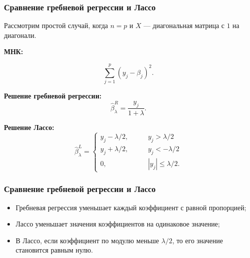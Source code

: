 \documentclass[unicode, notheorems]{beamer}
\begin{document}
\begin{frame}
\begin{frame}
\end{frame}


\begin{frame}
\frametitle{Сравнение гребневой регрессии и Лассо}
Рассмотрим простой случай, когда $n = p$ и $X$ --- диагональная матрица с $1$ на диагонали.

\textbf{МНК:}

\[\sum_{j =1}^p (y_j - \beta_j)^2.\]

\textbf{Решение гребневой регрессии:}
\[\hat{\beta}_{\lambda}^R = \frac{y_j}{1 + \lambda}.\]

\textbf{Решение Лассо:}
\begin{equation*}
\hat{\beta}_{\lambda}^L = 
 \begin{cases}
   y_j - \lambda/2, & \qquad y_j > \lambda/2\\
   y_j + \lambda/2, & \qquad y_j < -\lambda/2 \\
   0, & \qquad |y_j| \leq \lambda/2.
 \end{cases}
\end{equation*}



\end{frame}


\begin{frame}
\frametitle{Сравнение гребневой регрессии и Лассо}
\vspace{-0.3cm}

\begin{figure}

\end{figure}
\vspace{-0.3cm}

\begin{itemize}
\item Гребневая регрессия уменьшает каждый коэффициент с равной пропорцией; 
\item Лассо уменьшает значения коэффициентов на одинаковое значение;
\item В Лассо, если коэффициент по модулю меньше $\lambda/2$, то его значение становится равным нулю.
\end{itemize}


\end{frame}
\end{frame}
\end{document}
